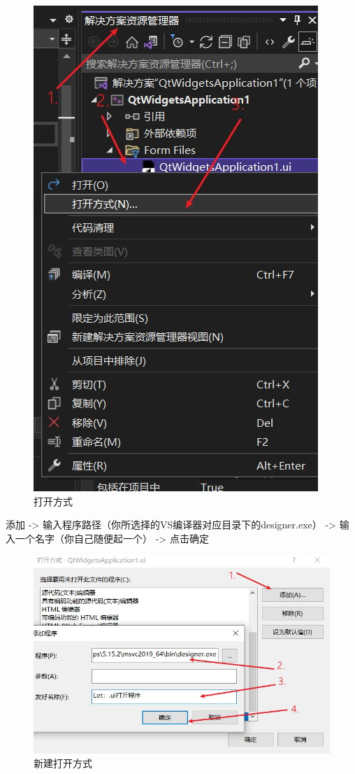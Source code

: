 \documentclass[cs4size,a4paper]{ctexart}
\numberwithin{equation}{section}
\numberwithin{table}{section}
\numberwithin{figure}{section}
\begin{document}
\begin{figure}[H]
\small
\centering
\includegraphics{打开方式.jpg}
\caption{打开方式} \label{fig:打开方式}
\end{figure}

\colorbox{LetMeFlyGray}{添加 -> 输入程序路径（你所选择的VS编译器对应目录下的designer.exe） -> 输入一个名字（你自己随便起一个） -> 点击确定}

\begin{figure}[H]
\small
\centering
\includegraphics{新建打开方式.jpg}
\caption{新建打开方式} \label{fig:新建打开方式}
\end{figure}
\end{document}
